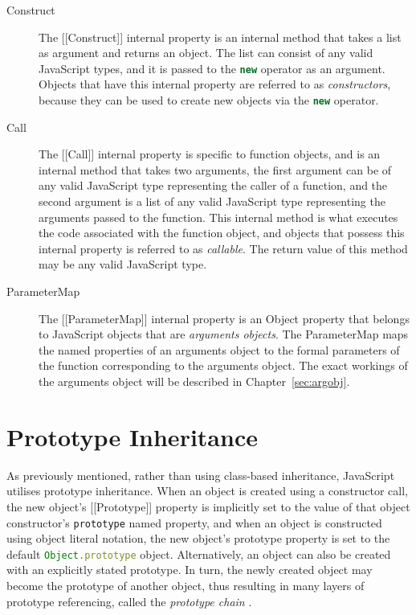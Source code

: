 \documentclass[a4paper,11pt,twoside]{report}
\def\jsinline{\lstinline[language=JavaScript, basicstyle=\small]}%\end{lstlisting}
\begin{document}
\begin{description}
\item[Construct]
The [[Construct]] internal property is an internal method that takes a list as argument and returns an object. The list can consist of any valid JavaScript types, and it is passed to the \jsinline|new| operator as an argument. Objects that have this internal property are referred to as \textit{constructors}, because they can be used to create new objects via the \jsinline|new| operator.

\item[Call]
The [[Call]] internal property is specific to function objects, and is an internal method that takes two arguments, the first argument can be of any valid JavaScript type representing the caller of a function, and the second argument is a list of any valid JavaScript type representing the arguments passed to the function. This internal method is what executes the code associated with the function object, and objects that possess this internal property is referred to as \textit{callable}. The return value of this method may be any valid JavaScript type.

\item[ParameterMap]
The [[ParameterMap]] internal property is an Object property that belongs to JavaScript objects that are \emph{arguments objects}. The ParameterMap maps the named properties of an arguments object to the formal parameters of the function corresponding to the arguments object. The exact workings of the arguments object will be described in Chapter~\ref{sec:argobj}.
\end{description}

\section{Prototype Inheritance}\label{sec:protoinh}
As previously mentioned, rather than using class-based inheritance, JavaScript utilises prototype inheritance. When an object is created using a constructor call, the new object's [[Prototype]] property is implicitly set to the value of that object constructor's \jsinline|prototype| named property, and when an object is constructed using object literal notation, the new object's prototype property is set to the default \jsinline|Object.prototype| object. Alternatively, an object can also be created with an explicitly stated prototype. In turn, the newly created object may become the prototype of another object, thus resulting in many layers of prototype referencing, called the \emph{prototype chain} \cite{EcmaScript}. 
\end{document}
